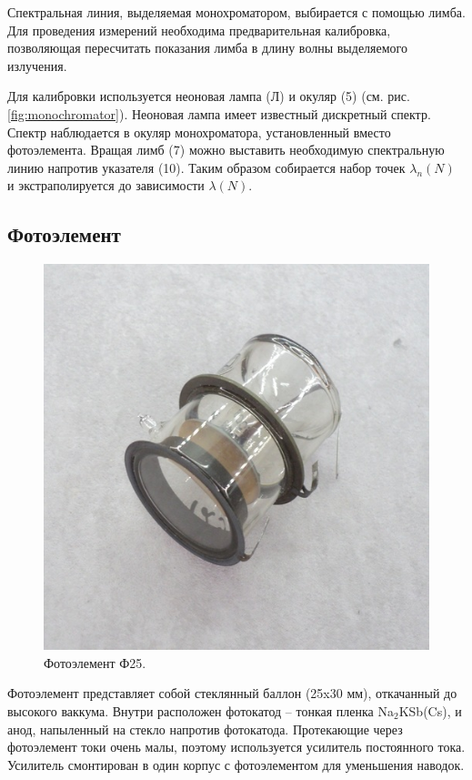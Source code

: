 \documentclass[12pt,a4paper]{article}
\newcommand{\figref}[1]{(см. рис. \ref{#1})}
\begin{document}
	Спектральная линия, выделяемая монохроматором, выбирается с помощью лимба. Для проведения измерений необходима предварительная калибровка, позволяющая пересчитать показания лимба в длину волны выделяемого излучения.
	
	Для калибровки используется неоновая лампа (Л) и окуляр (5) \figref{fig:monochromator}. Неоновая лампа имеет известный дискретный спектр. Спектр наблюдается в окуляр монохроматора, установленный вместо фотоэлемента. Вращая лимб (7) можно выставить необходимую спектральную линию напротив указателя (10). Таким образом собирается набор точек $\lambda_n(N)$ и экстраполируется до зависимости $\lambda(N)$.
	
	\subsection*{Фотоэлемент}
	
	\begin{figure}
		\includegraphics[width=\linewidth]{photos/f25.jpg}
		\caption{Фотоэлемент Ф25.}
		\label{fig:photoelem}
	\end{figure}
	
	Фотоэлемент представляет собой стеклянный баллон (25x30 мм), откачанный до высокого ваккума. Внутри расположен фотокатод -- тонкая пленка Na$_2$KSb(Cs), и анод, напыленный на стекло напротив фотокатода. Протекающие через фотоэлемент токи очень малы, поэтому используется усилитель постоянного тока. Усилитель смонтирован в один корпус с фотоэлементом для уменьшения наводок.
	
\end{document}
